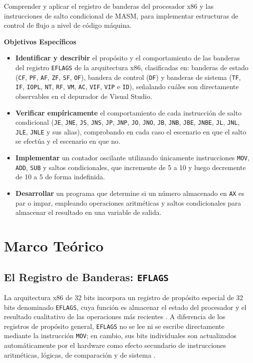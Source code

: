 \documentclass[a4paper,12pt]{article}
\begin{document}
Comprender y aplicar el registro de banderas del procesador x86 y las instrucciones de salto condicional de MASM, para implementar estructuras de control de flujo a nivel de código máquina.

\textbf{Objetivos Específicos}
\begin{itemize}
  \item \textbf{Identificar y describir} el propósito y el comportamiento de las banderas del registro \texttt{EFLAGS} de la arquitectura x86, clasificadas en: banderas de estado (\texttt{CF}, \texttt{PF}, \texttt{AF}, \texttt{ZF}, \texttt{SF}, \texttt{OF}), bandera de control (\texttt{DF}) y banderas de sistema (\texttt{TF}, \texttt{IF}, \texttt{IOPL}, \texttt{NT}, \texttt{RF}, \texttt{VM}, \texttt{AC}, \texttt{VIF}, \texttt{VIP} e \texttt{ID}), señalando cuáles son directamente observables en el depurador de Visual Studio.
  \item \textbf{Verificar empíricamente} el comportamiento de cada instrucción de salto condicional (\texttt{JE}, \texttt{JNE}, \texttt{JS}, \texttt{JNS}, \texttt{JP}, \texttt{JNP}, \texttt{JO}, \texttt{JNO}, \texttt{JB}, \texttt{JNB}, \texttt{JBE}, \texttt{JNBE}, \texttt{JL}, \texttt{JNL}, \texttt{JLE}, \texttt{JNLE} y sus alias), comprobando en cada caso el escenario en que el salto se efectúa y el escenario en que no.
  \item \textbf{Implementar} un contador oscilante utilizando únicamente instrucciones \texttt{MOV}, \texttt{ADD}, \texttt{SUB} y saltos condicionales, que incremente de 5 a 10 y luego decremente de 10 a 5 de forma indefinida.
  \item \textbf{Desarrollar} un programa que determine si un número almacenado en \texttt{AX} es par o impar, empleando operaciones aritméticas y saltos condicionales para almacenar el resultado en una variable de salida.
\end{itemize}

\section{Marco Teórico}
\subsection{El Registro de Banderas: \texttt{EFLAGS}}
La arquitectura x86 de 32 bits incorpora un registro de propósito especial de 32 bits denominado \texttt{EFLAGS}, cuya función es almacenar el estado del procesador y el resultado cualitativo de las operaciones más recientes \cite{irvine2020assembly}. A diferencia de los registros de propósito general, \texttt{EFLAGS} no se lee ni se escribe directamente mediante la instrucción \texttt{MOV}; en cambio, sus bits individuales son actualizados automáticamente por el hardware como efecto secundario de instrucciones aritméticas, lógicas, de comparación y de sistema \cite{stallings2019computer}.
\end{document}
